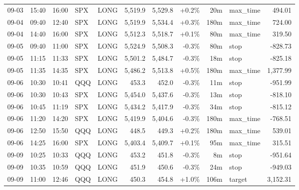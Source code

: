 \documentclass[11pt,a4paper,twoside]{article}
\begin{document}
\begin{center}
\begin{longtable}{>{\color{txtmain}}l l l l l r r r r >{\color{txtmain}}l r}
09-03 & 15:40 & 16:00 & SPX & LONG & 5,519.9 & 5,529.8 & \textcolor{wingreen}{+0.2\%} & 20m & max\_time & \textcolor{wingreen}{494.01} \\
09-04 & 09:40 & 12:40 & SPX & LONG & 5,519.9 & 5,534.4 & \textcolor{wingreen}{+0.3\%} & 180m & max\_time & \textcolor{wingreen}{724.00} \\
09-04 & 14:40 & 16:00 & SPX & LONG & 5,512.3 & 5,518.7 & \textcolor{wingreen}{+0.1\%} & 80m & max\_time & \textcolor{wingreen}{319.50} \\
09-05 & 09:40 & 11:00 & SPX & LONG & 5,524.9 & 5,508.3 & \textcolor{lossred}{-0.3\%} & 80m & stop & \textcolor{lossred}{-828.73} \\
09-05 & 11:15 & 11:33 & SPX & LONG & 5,501.2 & 5,484.7 & \textcolor{lossred}{-0.3\%} & 18m & stop & \textcolor{lossred}{-825.18} \\
09-05 & 11:35 & 14:35 & SPX & LONG & 5,486.2 & 5,513.8 & \textcolor{wingreen}{+0.5\%} & 180m & max\_time & \textcolor{wingreen}{1,377.99} \\
09-06 & 10:30 & 10:41 & QQQ & LONG & 453.3 & 452.0 & \textcolor{lossred}{-0.3\%} & 11m & stop & \textcolor{lossred}{-951.99} \\
09-06 & 10:30 & 10:43 & SPX & LONG & 5,454.0 & 5,437.6 & \textcolor{lossred}{-0.3\%} & 13m & stop & \textcolor{lossred}{-818.10} \\
09-06 & 10:45 & 11:19 & SPX & LONG & 5,434.2 & 5,417.9 & \textcolor{lossred}{-0.3\%} & 34m & stop & \textcolor{lossred}{-815.12} \\
09-06 & 11:20 & 14:20 & SPX & LONG & 5,419.9 & 5,404.6 & \textcolor{lossred}{-0.3\%} & 180m & max\_time & \textcolor{lossred}{-768.51} \\
09-06 & 12:50 & 15:50 & QQQ & LONG & 448.5 & 449.3 & \textcolor{wingreen}{+0.2\%} & 180m & max\_time & \textcolor{wingreen}{539.01} \\
09-06 & 14:25 & 16:00 & SPX & LONG & 5,403.4 & 5,409.7 & \textcolor{wingreen}{+0.1\%} & 95m & max\_time & \textcolor{wingreen}{315.51} \\
09-09 & 10:25 & 10:33 & QQQ & LONG & 453.2 & 451.8 & \textcolor{lossred}{-0.3\%} & 8m & stop & \textcolor{lossred}{-951.64} \\
09-09 & 10:35 & 10:59 & QQQ & LONG & 451.9 & 450.6 & \textcolor{lossred}{-0.3\%} & 24m & stop & \textcolor{lossred}{-949.03} \\
09-09 & 11:00 & 12:46 & QQQ & LONG & 450.3 & 454.8 & \textcolor{wingreen}{+1.0\%} & 106m & target & \textcolor{wingreen}{3,152.31} \\

\end{longtable}
\end{center}
\end{document}
